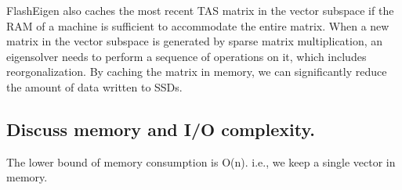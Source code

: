 FlashEigen also caches the most recent TAS matrix in the vector subspace if
the RAM of a machine is sufficient to accommodate the entire matrix.
When a new matrix in the vector subspace is generated by sparse matrix
multiplication, an eigensolver needs to perform a sequence of operations on it,
which includes reorgonalization. By caching the matrix in memory, we can
significantly reduce the amount of data written to SSDs.

\subsection{Discuss memory and I/O complexity.}
The lower bound of memory consumption is O(n). i.e., we keep a single vector
in memory.
